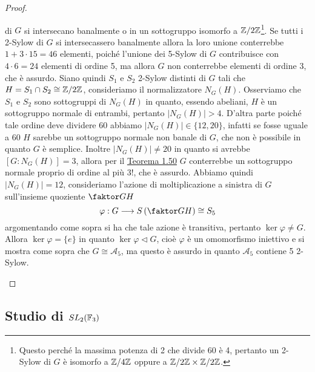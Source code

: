 \documentclass[11pt]{scrartcl}
\begin{document}
\begin{proof}
\begin{itemize}
        di $G$ si intersecano banalmente 
        o in un sottogruppo isomorfo a $\mathbb{Z}/{2}\mathbb{Z}$\footnote{
            Questo perché la massima potenza di 2 che divide 60 è 4, pertanto
            un 2-Sylow di $G$ è isomorfo a $\mathbb{Z}/{4}\mathbb{Z}$ oppure a $\mathbb{Z}/{2}\mathbb{Z}\times \mathbb{Z}/{2}\mathbb{Z}$.
        }. Se tutti i 2-Sylow di $G$ si intersecassero banalmente allora la 
        loro unione conterrebbe $1 + 3\cdot 15 = 46$ elementi, poiché l'unione dei
        5-Sylow di $G$ contribuisce con $4\cdot 6 = 24$ elementi di ordine 5,
        ma allora $G$ non conterrebbe elementi di ordine 3, che è assurdo.
        Siano quindi $S_1$ e $S_2$ 2-Sylow distinti di $G$ tali che 
        $H = S_1\cap S_2 \cong \mathbb{Z}/{2}\mathbb{Z}$, consideriamo il normalizzatore $N_G(H)$.
        Osserviamo che $S_1$ e $S_2$ sono sottogruppi di $N_G(H)$ in quanto, essendo
        abeliani, $H$ è un sottogruppo normale di entrambi, pertanto $|N_G(H)| > 4$.
        D'altra parte poiché tale ordine deve dividere 60 abbiamo 
        $|N_G(H)| \in \{12, 20\}$, infatti se fosse uguale a 60 $H$ sarebbe un 
        sottogruppo normale non banale di $G$, che non è possibile in quanto $G$
        è semplice. Inoltre $|N_G(H)| \neq 20$ in quanto si avrebbe $[G:N_G(H)] = 3$,
        allora per il \hyperref[teorema1.50]{Teorema 1.50} $G$ conterrebbe
        un sottogruppo normale proprio di ordine al più $3!$, che è assurdo.
        Abbiamo quindi $|N_G(H)| = 12$, consideriamo l'azione di 
        moltiplicazione a sinistra di $G$ sull'insieme quoziente $\faktor G H$
        \[
            \varphi : G\longrightarrow S\left(\faktor G H\right)\cong S_5
        \]
        argomentando come sopra si ha che tale azione è transitiva, pertanto
        $\ker\varphi \neq G$. Allora $\ker\varphi = \{e\}$ in quanto 
        $\ker\varphi\triangleleft G$, cioè $\varphi$ è un omomorfismo iniettivo
        e si mostra come sopra che $G \cong \mathcal{A}_5$, ma questo è assurdo 
        in quanto $\mathcal{A}_5$ contiene 5 2-Sylow.
    \end{itemize}
\end{proof}

\newpage

\subsection{Studio di $SL_2(\mathbb F_3)$}
\end{document}
